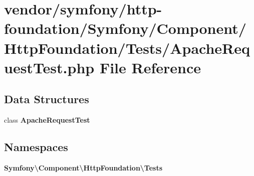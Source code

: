 \section{vendor/symfony/http-\/foundation/\+Symfony/\+Component/\+Http\+Foundation/\+Tests/\+Apache\+Request\+Test.php File Reference}
\label{_apache_request_test_8php}
\subsection*{Data Structures}
\begin{DoxyCompactItemize}
\item 
class {\bf Apache\+Request\+Test}
\end{DoxyCompactItemize}
\subsection*{Namespaces}
\begin{DoxyCompactItemize}
\item 
 {\bf Symfony\textbackslash{}\+Component\textbackslash{}\+Http\+Foundation\textbackslash{}\+Tests}
\end{DoxyCompactItemize}
